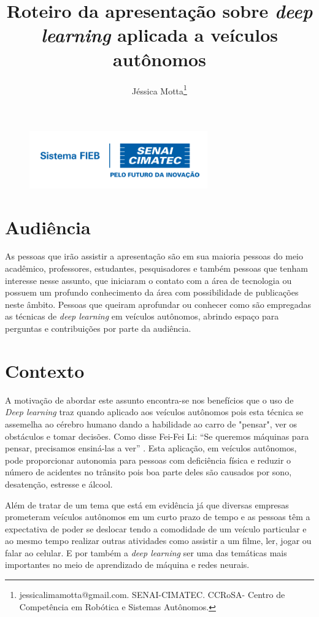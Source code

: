 \documentclass[12pt,a4paper]{article}
\begin{document}
 
\begin{figure}
    \flushright
    \includegraphics[scale=0.5]{Logo_senai.png}
\end{figure}

\title{Roteiro da apresentação sobre \emph{deep learning} aplicada a veículos autônomos}
\author{Jéssica Motta\thanks{jessicalimamotta@gmail.com. SENAI-CIMATEC. CCRoSA- Centro de Competência em Robótica e Sistemas Autônomos.}}
 

    \maketitle
    \singlespacing

    \section{Audiência}

    \par As pessoas que irão assistir a apresentação são em sua maioria pessoas do meio acadêmico, professores, estudantes, pesquisadores e também pessoas que tenham interesse nesse assunto, que iniciaram o contato com a área de tecnologia ou possuem um profundo conhecimento da área com possibilidade de publicações neste âmbito. Pessoas que queiram aprofundar ou conhecer como são empregadas as técnicas de \emph{deep learning} em veículos autônomos, abrindo espaço para perguntas e contribuições por parte da audiência.

    \section{Contexto}
    \par A motivação de abordar este assunto encontra-se nos benefícios que o uso de \emph{Deep learning} traz quando aplicado aos veículos autônomos pois esta técnica se assemelha ao cérebro humano dando a habilidade ao carro de "pensar", ver os obstáculos e tomar decisões. Como disse Fei-Fei Li: “Se queremos máquinas para pensar, precisamos ensiná-las a ver” \cite{1}. Esta aplicação, em veículos autônomos, pode proporcionar autonomia para pessoas com deficiência física e reduzir o número de acidentes no trânsito pois boa parte deles são causados por sono, desatenção, estresse e álcool. 
    \par Além de tratar de um tema que está em evidência já que diversas empresas prometeram veículos autônomos em um curto prazo de tempo e as pessoas têm a expectativa de poder se deslocar tendo a comodidade de um veículo particular e ao mesmo tempo realizar outras atividades como assistir a um filme, ler, jogar ou falar ao celular. E por também a \emph{deep learning} ser uma das temáticas mais importantes no meio de aprendizado de máquina e redes neurais.
  
\end{document}
